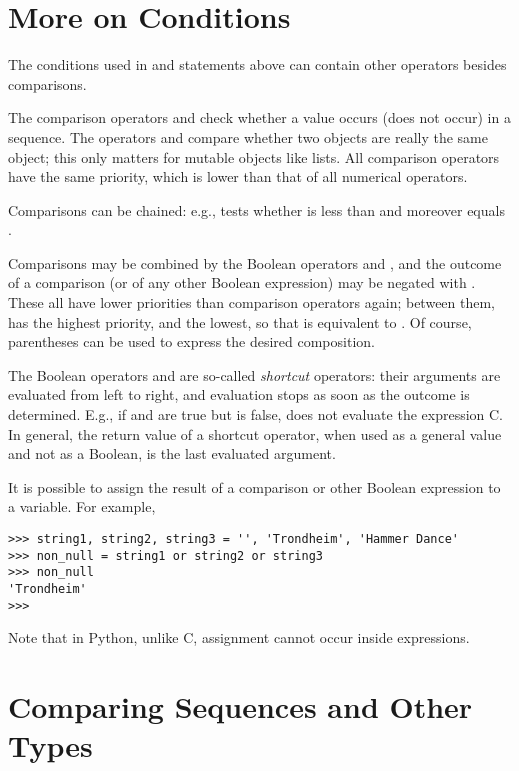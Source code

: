 \section{More on Conditions}

The conditions used in  and  statements above can
contain other operators besides comparisons.

The comparison operators  and  check whether a value
occurs (does not occur) in a sequence.  The operators  and
 compare whether two objects are really the same object; this
only matters for mutable objects like lists.  All comparison operators
have the same priority, which is lower than that of all numerical
operators.

Comparisons can be chained: e.g.,  tests whether 
is less than  and moreover  equals .

Comparisons may be combined by the Boolean operators  and
, and the outcome of a comparison (or of any other Boolean
expression) may be negated with .  These all have lower
priorities than comparison operators again; between them,  has
the highest priority, and  the lowest, so that
 is equivalent to .  Of
course, parentheses can be used to express the desired composition.

The Boolean operators  and  are so-called
\emph{shortcut} operators: their arguments are evaluated from left to
right, and evaluation stops as soon as the outcome is determined.
E.g., if  and  are true but  is false,  does not evaluate the expression C.  In general, the
return value of a shortcut operator, when used as a general value and
not as a Boolean, is the last evaluated argument.

It is possible to assign the result of a comparison or other Boolean
expression to a variable.  For example,

\bcode\begin{verbatim}
>>> string1, string2, string3 = '', 'Trondheim', 'Hammer Dance'
>>> non_null = string1 or string2 or string3
>>> non_null
'Trondheim'
>>> 
\end{verbatim}\ecode
%
Note that in Python, unlike C, assignment cannot occur inside expressions.

\section{Comparing Sequences and Other Types}

